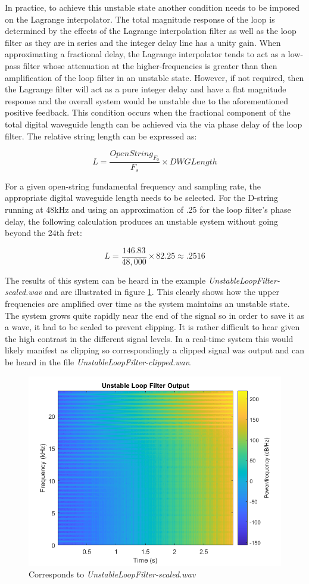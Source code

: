 \documentclass[../main.tex]{subfiles}
\begin{document}
In practice, to achieve this unstable state another condition needs to be imposed on the Lagrange interpolator. The total magnitude response of the loop is determined by the effects of the Lagrange interpolation filter as well as the loop filter as they are in series and the integer delay line has a unity gain. When approximating a fractional delay, the Lagrange interpolator tends to act as a low-pass filter whose attenuation at the higher-frequencies is greater than then amplification of the loop filter in an unstable state. However, if not required, then the Lagrange filter will act as a pure integer delay and have a flat magnitude response and the overall system would be unstable due to the aforementioned positive feedback. This condition occurs when the fractional component of the total digital waveguide length can be achieved via the via phase delay of the loop filter. The relative string length can be expressed as:

\begin{equation}
    L = \frac{OpenString_{F_0}}{F_s} \times DWGLength    
\end{equation}

For a given open-string fundamental frequency and sampling rate, the appropriate digital waveguide length needs to be selected. For the D-string running at 48kHz and using an approximation of .25 for the loop filter's phase delay, the following calculation produces an unstable system without going beyond the 24th fret:

\begin{equation}
    L = \frac{146.83}{48,000} \times 82.25 \approx .2516
\end{equation}

The results of this system can be heard in the example \emph{UnstableLoopFilter-scaled.wav} and are illustrated in figure \ref{fig:UnstableLoop}. This clearly shows how the upper frequencies are amplified over time as the system maintains an unstable state. The system grows quite rapidly near the end of the signal so in order to save it as a wave, it had to be scaled to prevent clipping. It is rather difficult to hear given the high contrast in the different signal levels. In a real-time system this would likely manifest as clipping so correspondingly a clipped signal was output and can be heard in the file \emph{UnstableLoopFilter-clipped.wav}.

\begin{figure}[h]
    \centering
    \includegraphics[scale=.65]{./images/plots/UnstableLoopFilter.png}
    \caption{Corresponds to \emph{UnstableLoopFilter-scaled.wav}}
    \label{fig:UnstableLoop}
\end{figure}
\end{document}
